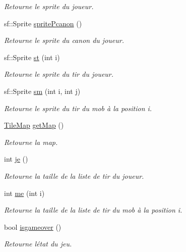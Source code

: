 \begin{DoxyCompactItemize}
\begin{DoxyCompactList}\small\item\em Retourne le sprite du joueur. \end{DoxyCompactList}\item 
sf\+::\+Sprite \hyperlink{classWorld_a2b2c53230bf0f789fb38bbd6d5f4feb7}{sprite\+Pcanon} ()
\begin{DoxyCompactList}\small\item\em Retourne le sprite du canon du joueur. \end{DoxyCompactList}\item 
sf\+::\+Sprite \hyperlink{classWorld_ad54259b8e35a3424e6aae5e530ab7811}{st} (int i)
\begin{DoxyCompactList}\small\item\em Retourne le sprite du tir du joueur. \end{DoxyCompactList}\item 
sf\+::\+Sprite \hyperlink{classWorld_a568baaaf16893722fb4102c261c5e17e}{sm} (int i, int j)
\begin{DoxyCompactList}\small\item\em Retourne le sprite du tir du mob à la position i. \end{DoxyCompactList}\item 
\hyperlink{classTileMap}{Tile\+Map} \hyperlink{classWorld_ac686b2503a9315f76bd93c362ee08520}{get\+Map} ()
\begin{DoxyCompactList}\small\item\em Retourne la map. \end{DoxyCompactList}\item 
int \hyperlink{classWorld_a804aaaacc7e7ce0cad149e419a497842}{je} ()
\begin{DoxyCompactList}\small\item\em Retourne la taille de la liste de tir du joueur. \end{DoxyCompactList}\item 
int \hyperlink{classWorld_a5793d35698e731469c63a9dff298ea0a}{me} (int i)
\begin{DoxyCompactList}\small\item\em Retourne la taille de la liste de tir du mob à la position i. \end{DoxyCompactList}\item 
bool \hyperlink{classWorld_a321628349a53070bd5cfa209987fbf4a}{isgameover} ()
\begin{DoxyCompactList}\small\item\em Retourne l\textquotesingle{}état du jeu. \end{DoxyCompactList}\item 

\end{DoxyCompactItemize}

